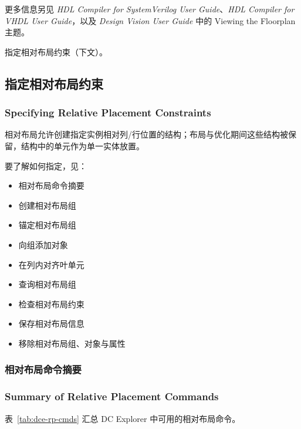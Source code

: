 更多信息另见 \textit{HDL Compiler for SystemVerilog User Guide}、\textit{HDL Compiler for VHDL User Guide}，以及 \textit{Design Vision User Guide} 中的 Viewing the Floorplan 主题。

\begin{seeAlsoBox}
指定相对布局约束（下文）。
\end{seeAlsoBox}

\subsection{指定相对布局约束}
\subsubsection*{Specifying Relative Placement Constraints}

相对布局允许创建指定实例相对列/行位置的结构；布局与优化期间这些结构被保留，结构中的单元作为单一实体放置。

要了解如何指定，见：
\begin{itemize}
  \item 相对布局命令摘要
  \item 创建相对布局组
  \item 锚定相对布局组
  \item 向组添加对象
  \item 在列内对齐叶单元
  \item 查询相对布局组
  \item 检查相对布局约束
  \item 保存相对布局信息
  \item 移除相对布局组、对象与属性
\end{itemize}

\subsubsection{相对布局命令摘要}
\subsubsection*{Summary of Relative Placement Commands}

表~\ref{tab:dce-rp-cmds} 汇总 DC Explorer 中可用的相对布局命令。

